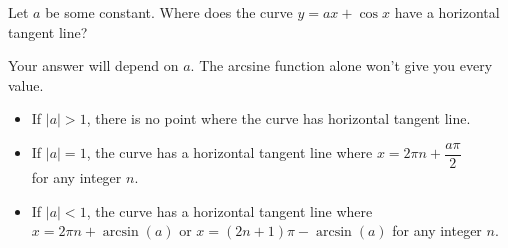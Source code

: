 \begin{question}
Let $a$ be some constant. Where does the curve $y=ax+\cos x$ have a horizontal tangent line?
\end{question}
\begin{hint}
Your answer will depend on $a$. The arcsine function alone won't give you every value.
\end{hint}
\begin{answer}
\begin{itemize}
\item If $|a|>1$, there is no point where the curve has horizontal tangent line.
\item If $|a|=1$, the curve has a horizontal tangent line where
$x=2\pi n + \dfrac{a\pi}{2}$\\ for any integer $n$.
\item If $|a|<1$, the curve has a horizontal tangent line where
$x=2\pi n+\arcsin(a)$ or $x=(2 n +1) \pi - \arcsin (a)$ for any integer $n$.
\end{itemize}
\end{answer}
